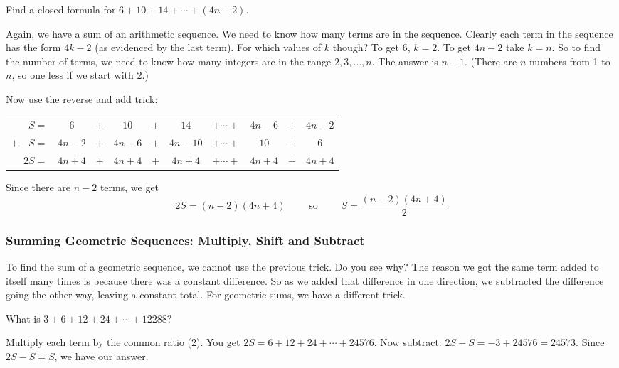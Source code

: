 \documentclass[12pt]{article}
\begin{document}
\begin{example} 
  Find a closed formula for $6 + 10 + 14 + \cdots + (4n - 2)$.
  \begin{solution}
    Again, we have a sum of an arithmetic sequence.  We need to know how many terms are in the sequence.  Clearly each term in the sequence has the form $4k -2$ (as evidenced by the last term).  For which values of $k$ though?  To get 6, $k = 2$.  To get $4n-2$ take $k = n$.  So to find the number of terms, we need to know how many integers are in the range $2,3,\ldots, n$.  The answer is $n-1$.  (There are $n$ numbers from 1 to $n$, so one less if we start with 2.)
    
    Now use the reverse and add trick:
    
        \begin{center}
    \begin{tabular}{rccccccccc}
      $S  =  $& $6 $&$ + $& $10$ & $ + $ & $14$ & $+ \cdots + $ & $4n-6$ &$ + $ & $4n-2$ \\
     $+ \quad S  = $& $4n-2$ & $+ $ & $4n-6$ & $ + $ & $4n-10$& $+ \cdots + $& $10$ & $+$ & 6 \\ \hline
     $2S  = $& $4n+4$ & $+ $ & $4n+4$ & $ + $ & $4n+4$& $+ \cdots + $&$4n+4$ & $+$ & $4n+4$ \\
    \end{tabular}
    \end{center}
    
    Since there are $n-2$ terms, we get
    \[2S = (n-2)(4n+4)\qquad \mbox{ so }\qquad S = \frac{(n-2)(4n+4)}{2}\]
  \end{solution}

\end{example}


\subsubsection*{Summing Geometric Sequences: Multiply, Shift and Subtract}

To find the sum of a geometric sequence, we cannot use the previous trick.  Do you see why?  The reason we got the same term added to itself many times is because there was a constant difference.  So as we added that difference in one direction, we subtracted the difference going the other way, leaving a constant total.  For geometric sums, we have a different trick.

\begin{example} What is $3 + 6 + 12 + 24 + \cdots + 12288$? 
\begin{solution}
  Multiply each term by the common ratio (2).  You get $2S = 6 + 12 + 24 + \cdots + 24576$.   Now subtract: $2S - S = -3 + 24576 = 24573$.  Since $2S - S = S$, we have our answer. 
  \end{solution}
\end{example} 
\end{document}
